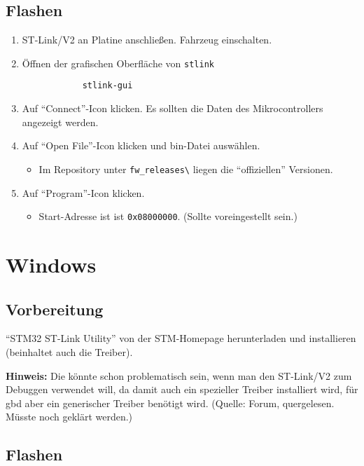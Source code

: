 \subsection{Flashen}


\begin{enumerate}
	\item ST-Link/V2 an Platine anschließen. Fahrzeug einschalten.
	\item Öffnen der grafischen Oberfläche von \texttt{stlink}
		\begin{verbatim}
			stlink-gui
		\end{verbatim}
	\item Auf "`Connect"'-Icon klicken. Es sollten die Daten des Mikrocontrollers angezeigt werden.
	\item Auf "`Open File"'-Icon klicken und bin-Datei auswählen.
		\begin{itemize}
			\item Im Repository unter \verb|fw_releases\| liegen die "`offiziellen"' Versionen.
		\end{itemize}
	\item Auf "`Program"'-Icon klicken.
		\begin{itemize}
			\item Start-Adresse ist ist \verb|0x08000000|. (Sollte voreingestellt sein.)
		\end{itemize}
\end{enumerate}


\section{Windows}

\subsection{Vorbereitung}

"`STM32 ST-Link Utility"' von der STM-Homepage herunterladen und installieren (beinhaltet auch die Treiber). 

\textbf{Hinweis:} Die könnte schon problematisch sein, wenn man den ST-Link/V2 zum Debuggen verwendet will, da damit auch ein spezieller Treiber installiert wird, für gbd aber ein generischer Treiber benötigt wird. (Quelle: Forum, quergelesen. Müsste noch geklärt werden.)



\subsection{Flashen}


